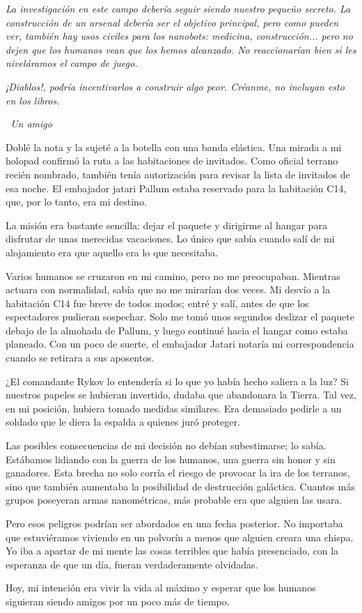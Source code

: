 \textit{La investigación en este campo debería seguir siendo nuestro pequeño secreto. La construcción de un arsenal debería ser el objetivo principal, pero como pueden ver, también hay usos civiles para los nanobots: medicina, construcción... pero no dejen que los humanos vean que los hemos alcanzado. No reaccionarían bien si les niveláramos el campo de juego.}

\textit{¡Diablos!, podría incentivarlos a construir algo peor. Créanme, no incluyan esto en los libros.}

\textit{~Un amigo}

Doblé la nota y la sujeté a la botella con una banda elástica. Una mirada a mi holopad confirmó la ruta a las habitaciones de invitados. Como oficial terrano recién nombrado, también tenía autorización para revisar la lista de invitados de esa noche. El embajador jatari Pallum estaba reservado para la habitación C14, que, por lo tanto, era mi destino.

La misión era bastante sencilla: dejar el paquete y dirigirme al hangar para disfrutar de unas merecidas vacaciones. Lo único que sabía cuando salí de mi alojamiento era que aquello era lo que necesitaba.

Varios humanos se cruzaron en mi camino, pero no me preocupaban. Mientras actuara con normalidad, sabía que no me mirarían dos veces. Mi desvío a la habitación C14 fue breve de todos modos; entré y salí, antes de que los espectadores pudieran sospechar. Solo me tomó unos segundos deslizar el paquete debajo de la almohada de Pallum, y luego continué hacia el hangar como estaba planeado. Con un poco de suerte, el embajador Jatari notaría mi correspondencia cuando se retirara a sus aposentos.

¿El comandante Rykov lo entendería si lo que yo había hecho saliera a la luz? Si nuestros papeles se hubieran invertido, dudaba que abandonara la Tierra. Tal vez, en mi posición, hubiera tomado medidas similares. Era demasiado pedirle a un soldado que le diera la espalda a quienes juró proteger.

Las posibles consecuencias de mi decisión no debían subestimarse; lo sabía. Estábamos lidiando con la guerra de los humanos, una guerra sin honor y sin ganadores. Esta brecha no solo corría el riesgo de provocar la ira de los terranos, sino que también aumentaba la posibilidad de destrucción galáctica. Cuantos más grupos poseyeran armas nanométricas, más probable era que alguien las usara.

Pero esos peligros podrían ser abordados en una fecha posterior. No importaba que estuviéramos viviendo en un polvorín a menos que alguien creara una chispa. Yo iba a apartar de mi mente las cosas terribles que había presenciado, con la esperanza de que un día, fueran verdaderamente olvidadas.

Hoy, mi intención era vivir la vida al máximo y esperar que los humanos siguieran siendo amigos por un poco más de tiempo.

